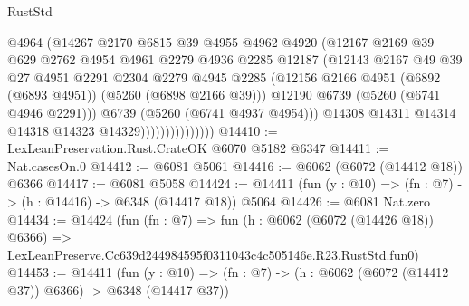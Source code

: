 \begin{lexlean}{RustStd}
\begin{coremodule}
                                @4964
                                (@14267
                                  @2170
                                  @6815
                                  @39
                                  @4955
                                  @4962
                                  @4920
                                  (@12167
                                    @2169
                                    @39
                                    @629
                                    @2762
                                    @4954
                                    @4961
                                    @2279
                                    @4936
                                    @2285
                                    @12187
                                    (@12143
                                      @2167
                                      @49
                                      @39
                                      @27
                                      @4951
                                      @2291
                                      @2304
                                      @2279
                                      @4945
                                      @2285
                                      (@12156
                                        @2166
                                        @4951
                                        (@6892 (@6893 @4951))
                                        (@5260 (@6898 @2166 @39)))
                                      @12190
                                      @6739
                                      (@5260 (@6741 @4946 @2291)))
                                    @6739
                                    (@5260 (@6741 @4937 @4954)))
                                  @14308
                                  @14311
                                  @14314
                                  @14318
                                  @14323
                                  @14329)))))))))))))))
@14410 := LexLeanPreservation.Rust.CrateOK @6070 @5182 @6347
@14411 := Nat.casesOn.{0}
@14412 := @6081 @5061
@14416 := @6062 (@6072 (@14412 @18)) @6366
@14417 := @6081 @5058
@14424 := @14411 (fun (y : @10) => (fn : @7) -> (h : @14416) -> @6348 (@14417 @18)) @5064
@14426 := @6081 Nat.zero
@14434 := @14424
    (fun (fn : @7) =>
    fun (h : @6062 (@6072 (@14426 @18)) @6366) =>
    LexLeanPreserve.Cc639d244984595f0311043c4c505146e.R23.RustStd.fun0)
@14453 := @14411
    (fun (y : @10) => (fn : @7) -> (h : @6062 (@6072 (@14412 @37)) @6366) -> @6348 (@14417 @37))

\end{coremodule}
\end{lexlean}
